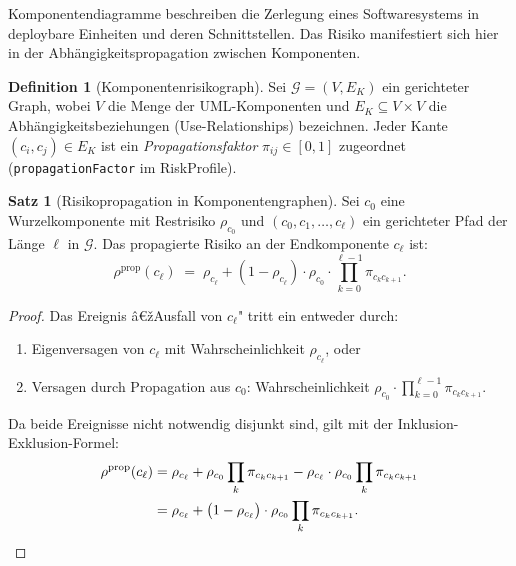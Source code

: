 ﻿\documentclass[a4paper,12pt]{article}
\theoremstyle{definition}
\newtheorem{definition}{Definition}
\newtheorem{satz}{Satz}
\newenvironment{beweis}{\begin{proof}}{\end{proof}}
\begin{document}
Komponentendiagramme beschreiben die Zerlegung eines Softwaresystems in
deploybare Einheiten und deren Schnittstellen. Das Risiko manifestiert sich
hier in der Abh\"angigkeitspropagation zwischen Komponenten.

\begin{definition}[Komponentenrisikograph]
\label{def:kompgraph}
    Sei $\mathcal{G} = (V, E_K)$ ein gerichteter Graph, wobei $V$ die Menge der
    UML-Komponenten und $E_K \subseteq V \times V$ die Abh\"angigkeitsbeziehungen
    (Use-Relationships) bezeichnen. Jeder Kante $(c_i, c_j) \in E_K$ ist ein
    \emph{Propagationsfaktor} $\pi_{ij} \in [0,1]$ zugeordnet
    (\texttt{propagationFactor} im \textsf{RiskProfile}).
\end{definition}

\begin{satz}[Risikopropagation in Komponentengraphen]
\label{satz:komp-propagation}
    Sei $c_0$ eine Wurzelkomponente mit Restrisiko $\rho_{c_0}$ und
    $(c_0, c_1, \ldots, c_\ell)$ ein gerichteter Pfad der L\"ange $\ell$ in
    $\mathcal{G}$. Das propagierte Risiko an der Endkomponente $c_\ell$ ist:
    \[
        \rho^{\mathrm{prop}}(c_\ell) \;=\; \rho_{c_\ell} +
        \left(1 - \rho_{c_\ell}\right) \cdot \rho_{c_0} \cdot
        \prod_{k=0}^{\ell-1} \pi_{c_k c_{k+1}}.
    \]
\end{satz}

\begin{beweis}
    Das Ereignis â€žAusfall von $c_\ell$" tritt ein entweder durch:
    \begin{enumerate}[label=(\roman*)]
        \item Eigenversagen von $c_\ell$ mit Wahrscheinlichkeit $\rho_{c_\ell}$, oder
        \item Versagen durch Propagation aus $c_0$: Wahrscheinlichkeit
              $\rho_{c_0} \cdot \prod_{k=0}^{\ell-1} \pi_{c_k c_{k+1}}$.
    \end{enumerate}
    Da beide Ereignisse nicht notwendig disjunkt sind, gilt mit der
    Inklusion-Exklusion-Formel:
    \begin{align*}
        \rho^{\mathrm{prop}}(c_\ell)
        &= \rho_{c_\ell} + \rho_{c_0} \prod_k \pi_{c_k c_{k+1}}
           - \rho_{c_\ell} \cdot \rho_{c_0} \prod_k \pi_{c_k c_{k+1}} \\
        &= \rho_{c_\ell} + \bigl(1 - \rho_{c_\ell}\bigr) \cdot
           \rho_{c_0} \prod_k \pi_{c_k c_{k+1}}.
        \quad\qedhere
    \end{align*}
\end{beweis}
\end{document}
